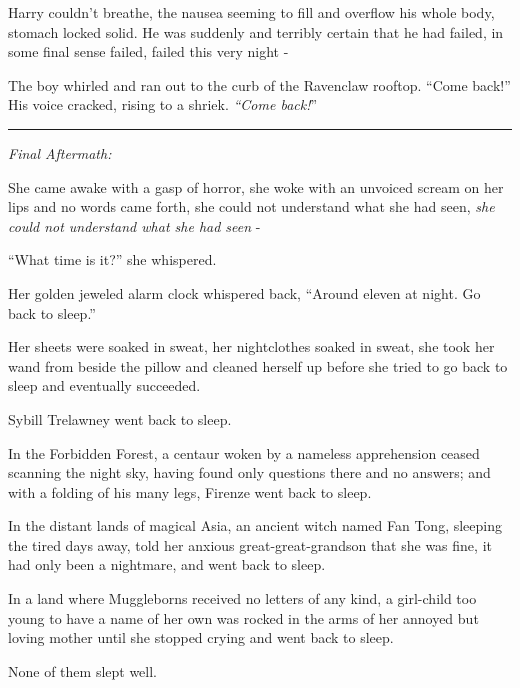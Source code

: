 Harry couldn't breathe, the nausea seeming to fill and overflow his whole body, stomach locked solid. He was suddenly and terribly certain that he had failed, in some final sense failed, failed this very night -

The boy whirled and ran out to the curb of the Ravenclaw rooftop. ``Come back!'' His voice cracked, rising to a shriek. \emph{``Come back!}''

\begin{center}\rule{3in}{0.4pt}\end{center}

\emph{Final Aftermath:}

She came awake with a gasp of horror, she woke with an unvoiced scream on her lips and no words came forth, she could not understand what she had seen, \emph{she could not understand what she had seen} -

``What time is it?'' she whispered.

Her golden jeweled alarm clock whispered back, ``Around eleven at night. Go back to sleep.''

Her sheets were soaked in sweat, her nightclothes soaked in sweat, she took her wand from beside the pillow and cleaned herself up before she tried to go back to sleep and eventually succeeded.

Sybill Trelawney went back to sleep.

In the Forbidden Forest, a centaur woken by a nameless apprehension ceased scanning the night sky, having found only questions there and no answers; and with a folding of his many legs, Firenze went back to sleep.

In the distant lands of magical Asia, an ancient witch named Fan Tong, sleeping the tired days away, told her anxious great-great-grandson that she was fine, it had only been a nightmare, and went back to sleep.

In a land where Muggleborns received no letters of any kind, a girl-child too young to have a name of her own was rocked in the arms of her annoyed but loving mother until she stopped crying and went back to sleep.

None of them slept well.
